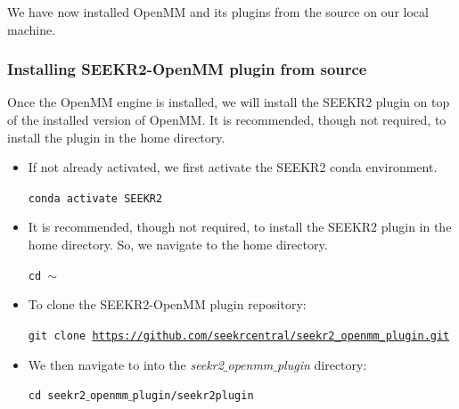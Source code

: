 \documentclass[9pt,training,pubversion]{livecoms}
\newcommand{\seekropenmmpluginlink}{\url{https://github.com/seekrcentral/seekr2_openmm_plugin.git}}
\begin{document}
\noindent We have now installed OpenMM and its plugins from the source on our local machine.

\subsubsection{Installing SEEKR2-OpenMM plugin from source}
\vspace{2mm}

\noindent Once the OpenMM engine is installed, we will install the SEEKR2 plugin on top of the installed version of OpenMM. It is recommended, though not required, to install the plugin in the home directory. 

\begin{itemize}

\item If not already activated, we first activate the SEEKR2 conda environment. 

\begin{tcolorbox}[colback=black!8!white, colframe=black!50!black, fontlower=\tiny, left=2pt, right=2pt, top=2pt, bottom=2pt]  
\texttt{conda activate SEEKR2}
\end{tcolorbox}

\item It is recommended, though not required, to install the SEEKR2 plugin in the home directory. So, we navigate to the home directory. 

\begin{tcolorbox}[colback=black!8!white, colframe=black!50!black, fontlower=\tiny, left=2pt, right=2pt, top=2pt, bottom=2pt] 
\texttt{cd $\sim$}
\end{tcolorbox}

\item To clone the SEEKR2-OpenMM plugin repository:

\begin{tcolorbox}[colback=black!8!white, colframe=black!50!black, fontlower=\tiny, left=2pt, right=2pt, top=2pt, bottom=2pt]  
\texttt{git clone \seekropenmmpluginlink}
\end{tcolorbox}

\item We then navigate to into the \textit{seekr2$\_$openmm$\_$plugin} directory:

\begin{tcolorbox}[colback=black!8!white, colframe=black!50!black, fontlower=\tiny, left=2pt, right=2pt, top=2pt, bottom=2pt]  
\texttt{cd seekr2$\_$openmm$\_$plugin/seekr2plugin}
\end{tcolorbox}


\end{itemize}
\end{document}
